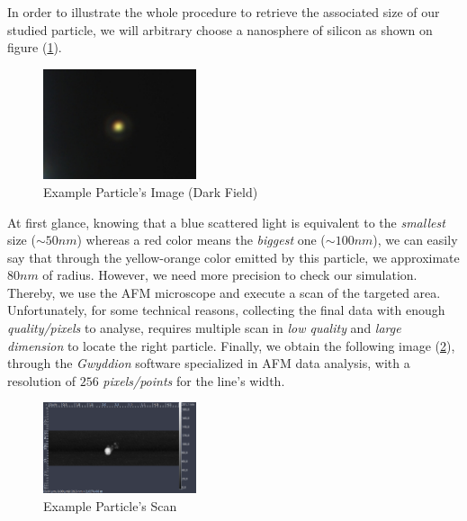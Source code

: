 \documentclass{article}
\numberwithin{equation}{section}
\begin{document}
In order to illustrate the whole procedure to retrieve the associated size of our studied particle, we will arbitrary choose a nanosphere of silicon as shown on figure (\ref{fig:gwyddion_df_ex}).
\begin{figure}[h]
    \centering
    \includegraphics[width=0.4\textwidth, height=0.32\textwidth]{gwyddion_df_ex.png}
    \caption{Example Particle's Image (Dark Field)}
    \label{fig:gwyddion_df_ex}
\end{figure}
At first glance, knowing that a blue scattered light is equivalent to the \textit{smallest} size ($\sim 50 nm$) whereas a red color means the \textit{biggest} one ($\sim 100 nm$), we can easily say that through the yellow-orange color emitted by this particle, we approximate $80 nm$ of radius. However, we need more precision to check our simulation. Thereby, we use the AFM microscope and execute a scan of the targeted area. Unfortunately, for some technical reasons, collecting the final data with enough \textit{quality/pixels} to analyse, requires multiple scan in \textit{low quality} and \textit{large dimension} to locate the right particle. Finally, we obtain the following image (\ref{fig:gwyddion_scan_ex}), through the \textit{Gwyddion} software specialized in AFM data analysis, with a resolution of $256$ \textit{pixels/points} for the line's width.
\begin{figure}[h]
    \centering
    \includegraphics[width=0.4\textwidth, height=0.32\textwidth]{gwyddion_scan_ex.png}
    \caption{Example Particle's Scan}
    \label{fig:gwyddion_scan_ex}
\end{figure}
\end{document}
